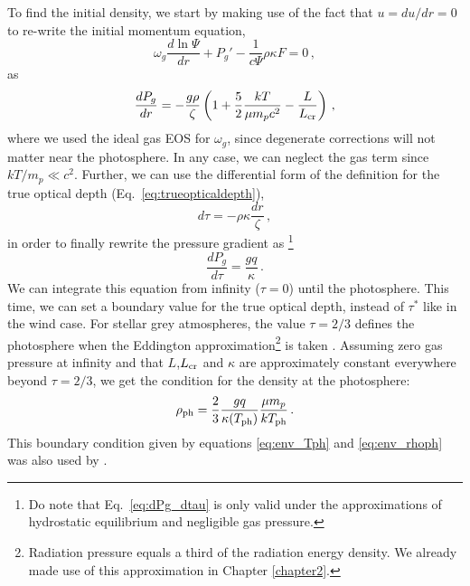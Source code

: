 \documentclass[../main.tex]{subfiles}
\begin{document}
To find the initial density, we start by making use of the fact that $u=du/dr=0$ to re-write the initial momentum equation,
\begin{equation}
    \omega_g\frac{d\ln\Psi}{dr} + P_g' - \frac{1}{c\Psi}\rho\kappa F = 0\,,
\end{equation}
as
\begin{equation}
    \frac{dP_g}{dr}=-\frac{g\rho}{\zeta}\left(1+\frac{5}{2}\frac{kT}{\mu m_pc^2}-\frac{L}{L_\text{cr}}\right)\,,
\end{equation}
where we used the ideal gas EOS for $\omega_g$, since degenerate corrections will not matter near the photosphere. In any case, we can neglect the gas term since $kT/m_p\ll c^2$. Further, we can use the differential form of the definition for the true optical depth (Eq.~\ref{eq:trueopticaldepth}),
\begin{equation}
    d\tau=-\rho\kappa\frac{dr}{\zeta}\,,
\end{equation}
in order to finally rewrite the pressure gradient as \footnote{Do note that Eq.~\eqref{eq:dPg_dtau} is only valid under the approximations of hydrostatic equilibrium and negligible gas pressure.}
\begin{equation}\label{eq:dPg_dtau}
    \frac{dP_g}{d\tau}=\frac{gq}{\kappa} \,.
\end{equation}
We can integrate this equation from infinity ($\tau=0$) until the photosphere. This time, we can set a boundary value for the true optical depth, instead of $\tau^*$ like in the wind case. For stellar grey atmospheres, the value $\tau=2/3$ defines the photosphere when the Eddington approximation\footnote{Radiation pressure equals a third of the radiation energy density. We already made use of this approximation in Chapter \ref{chapter2}.} is taken \citep{Mihalas1978}. Assuming zero gas pressure at infinity and that $L$,$L_\text{cr}$ and $\kappa$ are approximately constant everywhere beyond $\tau=2/3$, we get the condition for the density at the photosphere:
\begin{equation}\label{eq:env_rhoph}
    \rho_\text{ph}=\frac{2}{3}\frac{gq}{\kappa(T_\text{ph})}\frac{\mu m_p}{kT_\text{ph}}\,.
\end{equation}
This boundary condition given by equations \eqref{eq:env_Tph} and \eqref{eq:env_rhoph} was also used by \citet{Paczynski1986a}. 
\end{document}
